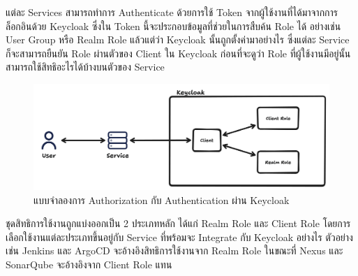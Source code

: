 แต่ละ Services สามารถทำการ Authenticate ด้วยการใช้ Token จากผู้ใช้งานที่ได้มาจากการล็อกอินด้วย Keycloak ซึ่งใน Token นี้จะประกอบข้อมูลที่ช่วยในการสืบค้น Role ได้ อย่างเช่น User Group หรือ Realm Role แล้วแต่ว่า Keycloak นั้นถูกตั้งค่ามาอย่างไร ซึ่งแต่ละ Service ก็จะสามารถยืนยัน Role ผ่านตัวของ Client ใน Keycloak ก่อนที่จะดูว่า Role ที่ผู้ใช้งานมีอยู่นั้น สามารถใช้สิทธิอะไรได้บ้างบนตัวของ Service
\begin{figure}[H]
    \begin{center}
        \includegraphics[scale=0.19]{resources/authorization-diagram.png}
    \end{center}
    \caption[แบบจำลองการ Authorization กับ Authentication ผ่าน Keycloak]{แบบจำลองการ Authorization กับ Authentication ผ่าน Keycloak}
    \label{fig:authorization-diagram}
\end{figure}
ชุดสิทธิการใช้งานถูกแบ่งออกเป็น 2 ประเภทหลัก ได้แก่ Realm Role และ Client Role โดยการเลือกใช้งานแต่ละประเภทขึ้นอยู่กับ Service ที่พร้อมจะ Integrate กับ Keycloak อย่างไร ตัวอย่างเช่น Jenkins และ ArgoCD จะอ้างอิงสิทธิการใช้งานจาก Realm Role ในขณะที่ Nexus และ SonarQube จะอ้างอิงจาก Client Role แทน

